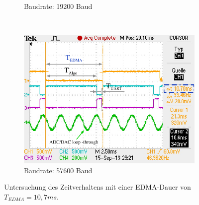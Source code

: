 \begin{figure}
\begin{subfigure}[b]{0.6\textwidth}
                \caption{Baudrate: 19200 Baud}
                \label{fig:Profile_UART_19200}
        \end{subfigure}
        ~ %
        \begin{subfigure}[b]{0.6\textwidth}
                \centering
                \includegraphics[width=\textwidth]{images/04_Echtzeitversuch/Profile_UART_57600}
                \caption{Baudrate: 57600 Baud}
                \label{fig:Profile_UART_57600}
        \end{subfigure}
        \caption{Untersuchung des Zeitverhaltens mit einer EDMA-Dauer von $T_{EDMA} = 10,7ms$.}
        \label{fig:profiling}
\end{figure}












